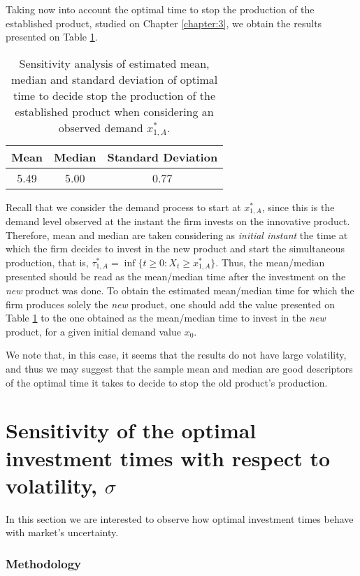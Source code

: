Taking now into account the optimal time to stop the production of the established product, studied on Chapter \ref{chapter:3}, we obtain the results presented on Table \ref{stoptime_t}.
\begin{table}[!htb]
	\caption{Sensitivity analysis of estimated mean, median and standard deviation of optimal time to decide stop the production of the established product when considering an observed demand $x_{1,A}^*$.}
	\centering
	\vspace{2mm}
	\begin{tabular}{ccc}
		Mean & Median & Standard Deviation \\ \hline
		5.49 & 5.00 & 0.77
	\end{tabular}
\label{stoptime_t}
\end{table}

Recall that we consider the demand process to start at $x_{1,A}^*$, since this is the demand level observed at the instant the firm invests on the innovative product. Therefore, mean and median are taken considering as \textit{initial instant} the time at which the firm decides to invest in the new product and start the simultaneous production, that is, $\tau^*_{1,A}=\inf \{ t\geq 0: X_t \geq x^*_{1,A} \}$. Thus, the mean/median presented should be read as the mean/median time after the investment on the \textit{new} product was done. To obtain the estimated mean/median time for which the firm produces solely the \textit{new} product, one should add the value presented on Table \ref{stoptime_t} to the one obtained as the mean/median time to invest in the \textit{new} product, for a given initial demand value $x_0$.    

We note that, in this case, it seems that the results do not have large volatility, and thus we may suggest that the sample mean and median are good descriptors of the optimal time it takes to decide to stop the old product's production.



\section{Sensitivity of the optimal investment times with respect to volatility, $\sigma$}

In this section we are interested to observe how optimal investment times behave with market's uncertainty.

\subsubsection{Methodology}

